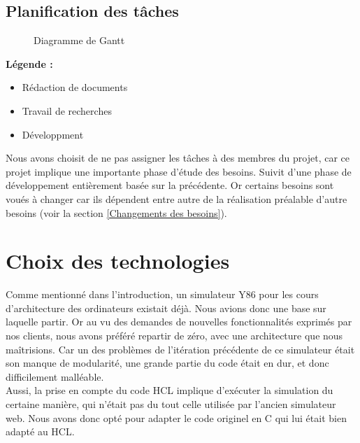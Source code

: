 \documentclass[french]{article}
\begin{document}
\newpage
\begin{landscape}
    \section{Planification des tâches}
    \begin{figure}[H]
        \centering
        \caption{Diagramme de Gantt}
        \label{fig:gantt}
    \end{figure}
    \textbf{Légende :}
    \\
    \begin{itemize}
        \item[] \colorbox{ganttBlue}{\color{ganttBlue}{ - }} Rédaction de documents
        \\
        \item[] \colorbox{ganttGreen}{\color{ganttGreen}{ - }} Travail de recherches
        \\
        \item[] \colorbox{ganttOrange}{\color{ganttOrange}{ - }} Développment
    \end{itemize}
    \bigskip
    \hspace{\parindent} Nous avons choisit de ne pas assigner les tâches à des membres du projet, car ce projet implique une importante phase d'étude des besoins. Suivit d'une phase de développement entièrement basée sur la précédente. Or certains besoins sont voués à changer car ils dépendent entre autre de la réalisation préalable d'autre besoins (voir la section \ref{Changements des besoins}).
\end{landscape}

\section{Choix des technologies}

Comme mentionné dans l'introduction, un simulateur Y86 pour les cours d'architecture des ordinateurs existait déjà. Nous avions donc une base sur laquelle partir. Or au vu des demandes de nouvelles fonctionnalités exprimés par nos clients, nous avons préféré repartir de zéro, avec une architecture que nous maîtrisions. Car un des problèmes de l'itération précédente de ce simulateur était son manque de modularité, une grande partie du code était en dur, et donc difficilement malléable.\\
Aussi, la prise en compte du code HCL implique d'exécuter la simulation du certaine manière, qui n'était pas du tout celle utilisée par l'ancien simulateur web. Nous avons donc opté pour adapter le code originel en C qui lui était bien adapté au HCL.
\end{document}
